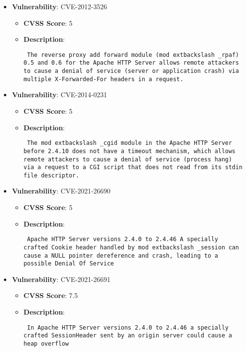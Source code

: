 \documentclass{article}
\begin{document}
\begin{itemize}
        \item \textbf{Vulnerability}: CVE-2012-3526
        \begin{itemize}
            \item \textbf{CVSS Score}:  5 
            \item \textbf{Description}: \parbox{\linewidth}{\texttt{ The reverse proxy add forward module (mod	extbackslash _rpaf) 0.5 and 0.6 for the Apache HTTP Server allows remote attackers to cause a denial of service (server or application crash) via multiple X-Forwarded-For headers in a request. }}
        \end{itemize}
    
        \item \textbf{Vulnerability}: CVE-2014-0231
        \begin{itemize}
            \item \textbf{CVSS Score}:  5 
            \item \textbf{Description}: \parbox{\linewidth}{\texttt{ The mod	extbackslash _cgid module in the Apache HTTP Server before 2.4.10 does not have a timeout mechanism, which allows remote attackers to cause a denial of service (process hang) via a request to a CGI script that does not read from its stdin file descriptor. }}
        \end{itemize}
    
        \item \textbf{Vulnerability}: CVE-2021-26690
        \begin{itemize}
            \item \textbf{CVSS Score}:  5 
            \item \textbf{Description}: \parbox{\linewidth}{\texttt{ Apache HTTP Server versions 2.4.0 to 2.4.46 A specially crafted Cookie header handled by mod	extbackslash _session can cause a NULL pointer dereference and crash, leading to a possible Denial Of Service }}
        \end{itemize}
    
        \item \textbf{Vulnerability}: CVE-2021-26691
        \begin{itemize}
            \item \textbf{CVSS Score}:  7.5 
            \item \textbf{Description}: \parbox{\linewidth}{\texttt{ In Apache HTTP Server versions 2.4.0 to 2.4.46 a specially crafted SessionHeader sent by an origin server could cause a heap overflow }}
        \end{itemize}
    

\end{itemize}
\end{document}
